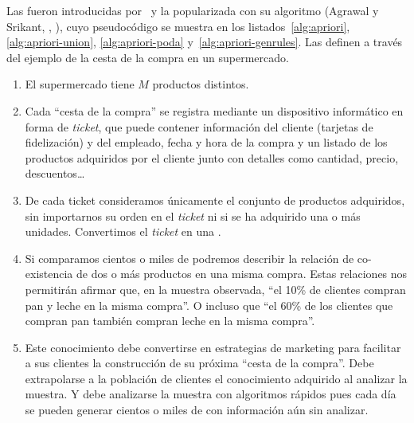 

Las \ARs fueron introducidas por~\citet{AgrawalImielinskiSwami-MiningAssociationRulesBetweenSetsOfItemsInLargeDB-1993} y la \arm popularizada con su algoritmo \apriori (Agrawal y Srikant, \cite*{AgrawalSrikant-FastAlgorithmsForMiningAssociationRules-1994}, \cite*{AgrawalSrikant-FastAlgorithmsForMiningAssociationRules-LARGO-1994}), cuyo pseudocódigo se muestra en los listados~\ref{alg:apriori}, \ref{alg:apriori-union}, \ref{alg:apriori-poda} y~\ref{alg:apriori-genrules}. Las definen a través del ejemplo de la cesta de la compra en un supermercado.
\begin{enumerate}
  \item El supermercado tiene $M$ productos distintos.
  \item Cada "`cesta de la compra"' se registra mediante un dispositivo informático en forma de \emph{ticket}, que puede contener información del cliente (tarjetas de fidelización) y del empleado, fecha y hora de la compra y un listado de los productos adquiridos por el cliente junto con detalles como cantidad, precio, descuentos\ldots
  \item De cada ticket consideramos únicamente el conjunto de productos adquiridos, sin importarnos su orden en el \emph{ticket} ni si se ha adquirido una o más unidades. Convertimos el \emph{ticket} en una \transaccion.
  \item Si comparamos cientos o miles de \transacciones podremos describir la relación de co-existencia de dos o más productos en una misma compra. Estas relaciones nos permitirán afirmar que, en la muestra observada, "`el 10\% de clientes compran pan y leche en la misma compra"'. O incluso que "`el 60\% de los clientes que compran pan también compran leche en la misma compra"'.
  \item Este conocimiento debe convertirse en estrategias de marketing para facilitar a sus clientes la construcción de su próxima "`cesta de la compra"'. Debe extrapolarse a la población de clientes el conocimiento adquirido al analizar la muestra. Y debe analizarse la muestra con algoritmos rápidos pues cada día se pueden generar cientos o miles de \transacciones con información aún sin analizar.
\end{enumerate}

